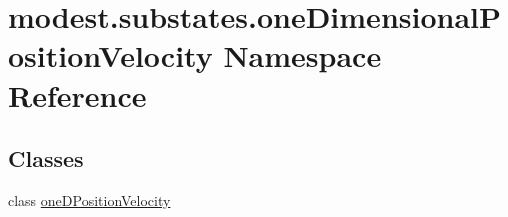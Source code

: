 \hypertarget{namespacemodest_1_1substates_1_1oneDimensionalPositionVelocity}{}\section{modest.\+substates.\+one\+Dimensional\+Position\+Velocity Namespace Reference}
\label{namespacemodest_1_1substates_1_1oneDimensionalPositionVelocity}
\subsection*{Classes}
\begin{DoxyCompactItemize}
\item 
class \hyperlink{classmodest_1_1substates_1_1oneDimensionalPositionVelocity_1_1oneDPositionVelocity}{one\+D\+Position\+Velocity}
\end{DoxyCompactItemize}
